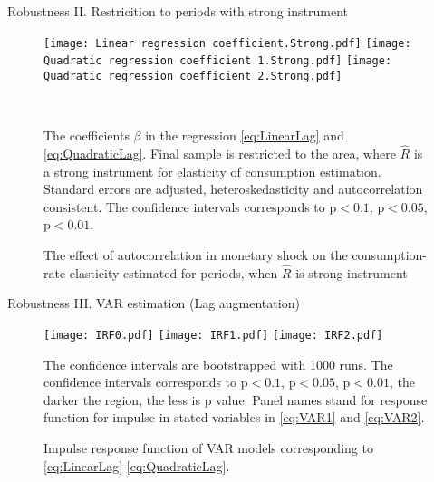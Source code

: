 \documentclass[11pt,pdf,aspectratio=129]{beamer}
\begin{document}
\begin{frame}{Robustness II. Restricition to periods with strong instrument}
    \begin{figure}[!htb]\centering  
        \begin{minipage}{\textwidth} \centering
            \caption{The effect of autocorrelation in monetary shock on the consumption-rate elasticity estimated for periods, when $\hat{R}$ is strong instrument}
            \begin{minipage}{\textwidth}
                \texttt{[image: Linear regression coefficient.Strong.pdf]}
                \texttt{[image: Quadratic regression coefficient 1.Strong.pdf]}
                \texttt{[image: Quadratic regression coefficient 2.Strong.pdf]}
            \end{minipage}\\
            {\begin{flushleft}\tiny The coefficients $\beta$ in the regression \eqref{eq:LinearLag} and \eqref{eq:QuadraticLag}. Final sample is restricted to the area, where $\hat{R}$ is a strong instrument for elasticity of consumption estimation.
            Standard errors are adjusted, heteroskedasticity and autocorrelation consistent. The confidence intervals corresponds to  p$<0.1$, p$<0.05$, p$<0.01$.\end{flushleft}}
        \end{minipage}
    \end{figure}


\end{frame}

\begin{frame}{Robustness III. VAR estimation (Lag augmentation)}
    
\begin{figure}[!htbp]
    \begin{minipage}{\textwidth} \centering
        \caption{Impulse response function of VAR models corresponding to \eqref{eq:LinearLag}-\eqref{eq:QuadraticLag}.}
        \label{fig:IRF}
        \begin{minipage}{\textwidth}
            \texttt{[image: IRF0.pdf]}
            \texttt{[image: IRF1.pdf]}
            \texttt{[image: IRF2.pdf]}
        \end{minipage}
        \begin{flushleft}\tiny
       The confidence intervals are bootstrapped with 1000 runs. 
       The confidence intervals corresponds to  p$<0.1$, p$<0.05$, p$<0.01$, the darker the region, the less is p value. 
       Panel names stand for response function for impulse in stated variables in \eqref{eq:VAR1} and \eqref{eq:VAR2}. 
    \end{flushleft}
    \end{minipage}
\end{figure}
\end{frame}
\end{document}
